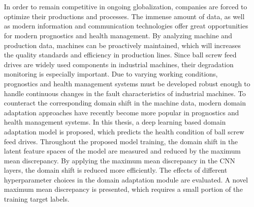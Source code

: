 \chapter{\abstractname}

In order to remain competitive in ongoing globalization, companies are forced to optimize their productions and processes. The immense amount of data, as well as modern information and communication technologies offer great opportunities for modern prognostics and health management. By analyzing machine and production data, machines can be proactively maintained, which will increases the quality standards and efficiency in production lines. Since ball screw feed drives are widely used components in industrial machines, their degradation monitoring is especially important. Due to varying working conditions, prognostics and health management systems must be developed robust enough to handle continuous changes in the fault characteristics of industrial machines. To counteract the corresponding domain shift in the machine data, modern domain adaptation approaches have recently become more popular in prognostics and health management systems. In this thesis, a deep learning based domain adaptation model is proposed, which predicts the health condition of ball screw feed drives. Throughout the proposed model training, the domain shift in the latent feature spaces of the model are measured and reduced by the maximum mean discrepancy. By applying the maximum mean discrepancy in the CNN layers, the domain shift is reduced more efficiently. The effects of different hyperparameter choices in the domain adaptation module are evaluated. A novel maximum mean discrepancy is presented, which requires a small portion of the training target labels. 


\makeatletter
{}
{\renewcommand{\abstractname}{Kurzfassung}}
{\renewcommand{\abstractname}{Abstract}}
\makeatother

\chapter{\abstractname}

